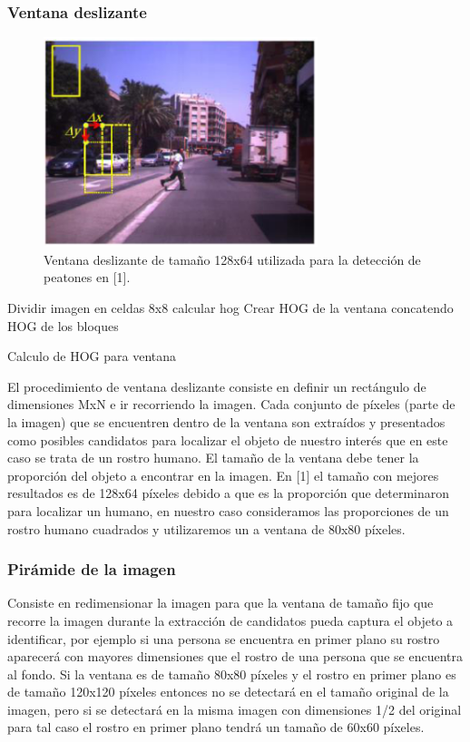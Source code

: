 \documentclass{article}
\begin{document}
\subsubsection*{\textbf{Ventana deslizante}}
\begin{figure}[ht]
\centering
\includegraphics[width=8cm]{ventana.png}
\caption{\label{tab1}Ventana deslizante de tamaño 128x64 utilizada para la detección de peatones en [1].} 
\label{fig:ventana}
\end{figure}


\begin{algorithm}
\SetAlgoLined
{}
 Dividir imagen en celdas 8x8\;
   {
  calcular hog\;
  }
  Crear HOG de la ventana concatendo HOG de los bloques
 \caption{Calculo de HOG para ventana}
\end{algorithm}



El procedimiento de ventana deslizante consiste en definir un rectángulo de dimensiones MxN e ir recorriendo la imagen.  Cada conjunto de píxeles (parte de la imagen) que se encuentren dentro de la ventana son extraídos y presentados como posibles  candidatos para localizar el objeto de nuestro interés que en este caso se trata de un rostro humano. 
El tamaño de la ventana debe tener la proporción del objeto a encontrar en la imagen. En [1] el tamaño con mejores resultados es de 128x64 píxeles debido a que es la proporción que determinaron para localizar un humano, en nuestro caso consideramos las proporciones de un rostro humano cuadrados y utilizaremos un a ventana de 80x80 píxeles.
\subsubsection*{\textbf{Pirámide de la imagen}}
Consiste en redimensionar la imagen para que la ventana de tamaño fijo que recorre la imagen durante la extracción de candidatos pueda captura el objeto a identificar, por ejemplo si una persona se encuentra en primer plano su rostro aparecerá con mayores dimensiones que el rostro de una persona que se encuentra al fondo. Si la ventana es de tamaño 80x80 píxeles y el rostro en primer plano es de tamaño 120x120 píxeles entonces no se detectará en el tamaño original de la imagen, pero si se detectará en la misma imagen con dimensiones 1/2 del original para tal caso el rostro en primer plano tendrá un tamaño de 60x60 píxeles. \\
\end{document}
